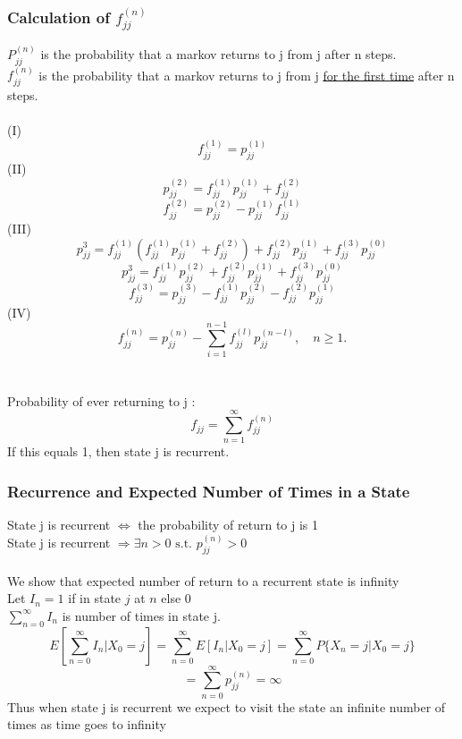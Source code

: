 \documentclass{article}
\begin{document}
   	\subsubsection{Calculation of \(f_{jj}^{(n)}\)}
    $P_{jj}^{(n)}$ is the probability that a markov returns to j from j after n steps. 
   	\\$f_{jj}^{(n)}$ is the probability that a markov returns to j from j \underline{for the first time} after n steps. 
   	\\
   	\\(I)
   	\[ f_{jj}^{(1)} = p_{jj}^{(1)} \]
    (II)
    \[ p_{jj}^{(2)} = f_{jj}^{(1)}p_{jj}^{(1)} + f_{jj}^{(2)}\] 
    \[ f_{jj}^{(2)} = p_{jj}^{(2)} - p_{jj}^{(1)}f_{jj}^{(1)}\]
    (III)
    \[ p_{jj}^3 = f_{jj}^{(1)}( f_{jj}^{(1)}p_{jj}^{(1)} + f_{jj}^{(2)} ) + f_{jj}^{(2)}p_{jj}^{(1)} + f_{jj}^{(3)}p_{jj}^{(0)} \]
    \[ p_{jj}^3 = f_{jj}^{(1)}p_{jj}^{(2)} + f_{jj}^{(2)}p_{jj}^{(1)} + f_{jj}^{(3)}p_{jj}^{(0)} \]
    \[ f_{jj}^{(3)} = p_{jj}^{(3)} - f_{jj}^{(1)}p_{jj}^{(2)} - f_{jj}^{(2)}p_{jj}^{(1)}\]
 	(IV)
 	\[f_{jj}^{(n)} = p_{jj}^{(n)} - \sum\limits_{i = 1}^{n-1}{f_{jj}^{(l)}p_{jj}^{(n-l)}}, \quad n \geq 1.\]
 	\\
 	\\Probability of ever returning to j : 
 	\[f_{jj} = \sum\limits_{n=1}^{\infty}{f_{jj}^{(n)}} \]
 	If this equals 1, then state j is recurrent. 
    
    \subsubsection{Recurrence and Expected Number of Times in a State}
    State j is recurrent \(\iff\) the probability of return to j is 1 
 	\\State j is recurrent \( \Rightarrow \exists n > 0 \mbox{ s.t. } p_{jj}^{(n)} >0 \)
	\\   
    \\ We show that expected number of return to a recurrent state is infinity
    \\ Let \(I_n = 1\) if in state \(j\) at \(n\) else \(0 \)
    \\ \(\sum\nolimits_{n=0}^{\infty}{I_n}\) is number of times in state j.
    \[E\left[ \sum\limits_{n=0}^{\infty}{I_n|X_0=j}\right]=\sum\limits_{n=0}^{\infty}{E\left[I_n|X_0=j\right]} = \sum\limits_{n=0}^{\infty}{P\{X_n=j|X_0=j\}}\]
    \[= \sum\limits_{n=0}^{\infty}{p_{jj}^{(n)}} = \infty \]
    Thus when state j is recurrent we expect to visit the state an infinite number of times as time goes to infinity
\end{document}
